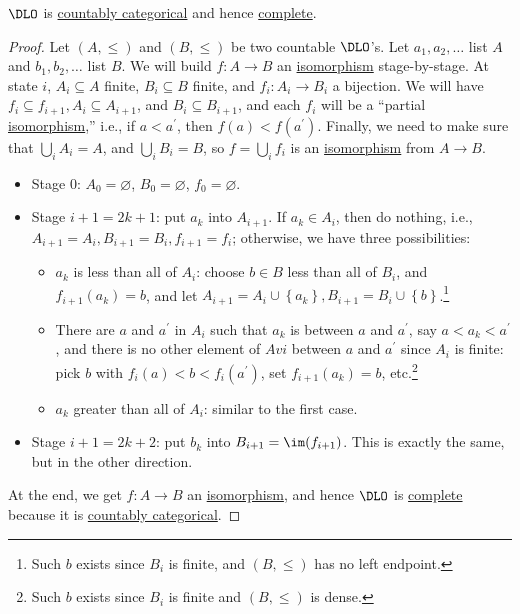 \begin{theorem}
	\(\DLO\) is \hyperref[def:countably-categorical]{countably categorical} and hence \hyperref[def:theory-complete]{complete}.
\end{theorem}
\begin{proof}
	Let \((A, \leq )\) and \((B, \leq )\) be two countable \(\DLO\)'s. Let \(a_1, a_2, \ldots \) list \(A\) and \(b_1, b_2, \ldots \) list \(B\). We will build \(f\colon A \to B\) an \hyperref[def:isomorphism]{isomorphism} stage-by-stage. At state \(i\), \(A_i \subseteq A\) finite, \(B_i \subseteq B\) finite, and \(f_i \colon A_i \to B_i\) a bijection. We will have \(f_i \subseteq f_{i+1} , A_i \subseteq A_{i+1} \), and \(B_i \subseteq B_{i+1} \), and each \(f_i\) will be a ``partial \hyperref[def:isomorphism]{isomorphism},'' i.e., if \(a < a^\prime \), then \(f(a) < f(a^\prime )\). Finally, we need to make sure that \(\bigcup_{i} A_i = A\), and \(\bigcup_{i} B_i = B\), so \(f = \bigcup_{i} f_i\) is an \hyperref[def:isomorphism]{isomorphism} from \(A \to B\).
	\begin{itemize}
		\item Stage \(0\): \(A_0 = \varnothing \), \(B_0 = \varnothing \), \(f_0 = \varnothing \).
		\item Stage \(i+1=2k+1\): put \(a_k\) into \(A_{i+1} \). If \(a_k \in A_i\), then do nothing, i.e., \(A_{i+1} = A_i, B_{i+1} = B_i, f_{i+1} = f_i\); otherwise, we have three possibilities:
		      \begin{itemize}
			      \item \(a_k\) is less than all of \(A_i\): choose \(b\in B\) less than all of \(B_i\), and \(f_{i+1}(a_k) = b\), and let \(A_{i+1} = A_i \cup \left\{ a_k \right\}, B_{i+1} = B_i \cup \left\{ b \right\} \).\footnote{Such \(b\) exists since \(B_i\) is finite, and \((B, \leq )\) has no left endpoint.}
			      \item There are \(a\) and \(a^\prime \) in \(A_i\) such that \(a_k\) is between \(a\) and \(a^\prime \), say \(a < a_k < a^\prime \), and there is no other element of \(Avi\) between \(a\) and \(a^\prime \) since \(A_i\) is finite: pick \(b\) with \(f_i(a) < b < f_i(a^\prime )\), set \(f_{i+1}(a_k) = b\), etc.\footnote{Such \(b\) exists since \(B_i\) is finite and \((B, \leq )\) is dense.}
			      \item \(a_k\) greater than all of \(A_i\): similar to the first case.
		      \end{itemize}
		\item Stage \(i+1 = 2k+2\): put \(b_k\) into \(B_{i+1} = \im(f_{i+1} )\). This is exactly the same, but in the other direction.
	\end{itemize}

	At the end, we get \(f\colon A \to B\) an \hyperref[def:isomorphism]{isomorphism}, and hence \(\DLO\) is \hyperref[def:theory-complete]{complete} because it is \hyperref[def:countably-categorical]{countably categorical}.
\end{proof}

